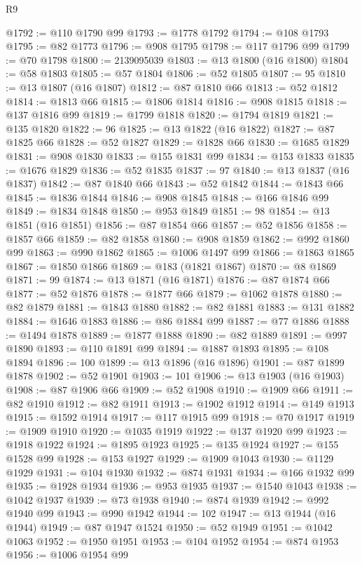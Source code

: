 \begin{lexlean}{R9}
\begin{coremodule}
@1792 := @110 @1790 @99
@1793 := @1778 @1792
@1794 := @108 @1793
@1795 := @82 @1773
@1796 := @908 @1795
@1798 := @117 @1796 @99
@1799 := @70 @1798
@1800 := 2139095039
@1803 := @13 @1800 (@16 @1800)
@1804 := @58 @1803
@1805 := @57 @1804
@1806 := @52 @1805
@1807 := 95
@1810 := @13 @1807 (@16 @1807)
@1812 := @87 @1810 @66
@1813 := @52 @1812
@1814 := @1813 @66
@1815 := @1806 @1814
@1816 := @908 @1815
@1818 := @137 @1816 @99
@1819 := @1799 @1818
@1820 := @1794 @1819
@1821 := @135 @1820
@1822 := 96
@1825 := @13 @1822 (@16 @1822)
@1827 := @87 @1825 @66
@1828 := @52 @1827
@1829 := @1828 @66
@1830 := @1685 @1829
@1831 := @908 @1830
@1833 := @155 @1831 @99
@1834 := @153 @1833
@1835 := @1676 @1829
@1836 := @52 @1835
@1837 := 97
@1840 := @13 @1837 (@16 @1837)
@1842 := @87 @1840 @66
@1843 := @52 @1842
@1844 := @1843 @66
@1845 := @1836 @1844
@1846 := @908 @1845
@1848 := @166 @1846 @99
@1849 := @1834 @1848
@1850 := @953 @1849
@1851 := 98
@1854 := @13 @1851 (@16 @1851)
@1856 := @87 @1854 @66
@1857 := @52 @1856
@1858 := @1857 @66
@1859 := @82 @1858
@1860 := @908 @1859
@1862 := @992 @1860 @99
@1863 := @990 @1862
@1865 := @1006 @1497 @99
@1866 := @1863 @1865
@1867 := @1850 @1866
@1869 := @183 (@1821 @1867)
@1870 := @8 @1869
@1871 := 99
@1874 := @13 @1871 (@16 @1871)
@1876 := @87 @1874 @66
@1877 := @52 @1876
@1878 := @1877 @66
@1879 := @1062 @1878
@1880 := @82 @1879
@1881 := @1843 @1880
@1882 := @82 @1881
@1883 := @131 @1882
@1884 := @1646 @1883
@1886 := @86 @1884 @99
@1887 := @77 @1886
@1888 := @1494 @1878
@1889 := @1877 @1888
@1890 := @82 @1889
@1891 := @997 @1890
@1893 := @110 @1891 @99
@1894 := @1887 @1893
@1895 := @108 @1894
@1896 := 100
@1899 := @13 @1896 (@16 @1896)
@1901 := @87 @1899 @1878
@1902 := @52 @1901
@1903 := 101
@1906 := @13 @1903 (@16 @1903)
@1908 := @87 @1906 @66
@1909 := @52 @1908
@1910 := @1909 @66
@1911 := @82 @1910
@1912 := @82 @1911
@1913 := @1902 @1912
@1914 := @149 @1913
@1915 := @1592 @1914
@1917 := @117 @1915 @99
@1918 := @70 @1917
@1919 := @1909 @1910
@1920 := @1035 @1919
@1922 := @137 @1920 @99
@1923 := @1918 @1922
@1924 := @1895 @1923
@1925 := @135 @1924
@1927 := @155 @1528 @99
@1928 := @153 @1927
@1929 := @1909 @1043
@1930 := @1129 @1929
@1931 := @104 @1930
@1932 := @874 @1931
@1934 := @166 @1932 @99
@1935 := @1928 @1934
@1936 := @953 @1935
@1937 := @1540 @1043
@1938 := @1042 @1937
@1939 := @73 @1938
@1940 := @874 @1939
@1942 := @992 @1940 @99
@1943 := @990 @1942
@1944 := 102
@1947 := @13 @1944 (@16 @1944)
@1949 := @87 @1947 @1524
@1950 := @52 @1949
@1951 := @1042 @1063
@1952 := @1950 @1951
@1953 := @104 @1952
@1954 := @874 @1953
@1956 := @1006 @1954 @99

\end{coremodule}
\end{lexlean}
